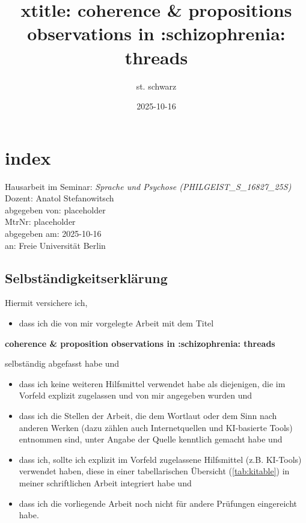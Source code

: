 \documentclass[
  12pt,
  oneside]{book}
\title{xtitle: coherence \& propositions observations in :schizophrenia: threads}
\author{st. schwarz}
\date{2025-10-16}
\providecommand{\tightlist}{%
  \setlength{\itemsep}{0pt}\setlength{\parskip}{0pt}}
\begin{document}
\maketitle

{
\setcounter{tocdepth}{1}
\tableofcontents
}
\chapter{index}\label{index}

Hausarbeit im Seminar: \emph{Sprache und Psychose (PHILGEIST\_S\_16827\_25S)}\\
Dozent: Anatol Stefanowitsch\\
abgegeben von: placeholder\\
MtrNr: placeholder\\
abgegeben am: 2025-10-16\\
an: Freie Universität Berlin

\section{Selbständigkeitserklärung}\label{selbstuxe4ndigkeitserkluxe4rung}

Hiermit versichere ich,

\begin{itemize}
\tightlist
\item
  dass ich die von mir vorgelegte Arbeit mit dem Titel
\end{itemize}

\textbf{coherence \& proposition observations in :schizophrenia: threads}

selbständig abgefasst habe und

\begin{itemize}
\tightlist
\item
  dass ich keine weiteren Hilfsmittel verwendet habe als diejenigen, die im Vorfeld explizit zugelassen und von mir angegeben wurden und
\item
  dass ich die Stellen der Arbeit, die dem Wortlaut oder dem Sinn nach anderen Werken (dazu zählen auch Internetquellen und KI-basierte Tools) entnommen sind, unter Angabe der Quelle kenntlich gemacht habe und
\item
  dass ich, sollte ich explizit im Vorfeld zugelassene Hilfsmittel (z.B. KI-Tools) verwendet haben, diese in einer tabellarischen Übersicht (\ref{tab:kitable}) in meiner schriftlichen Arbeit integriert habe und
\item
  dass ich die vorliegende Arbeit noch nicht für andere Prüfungen eingereicht habe.
\end{itemize}
\end{document}
